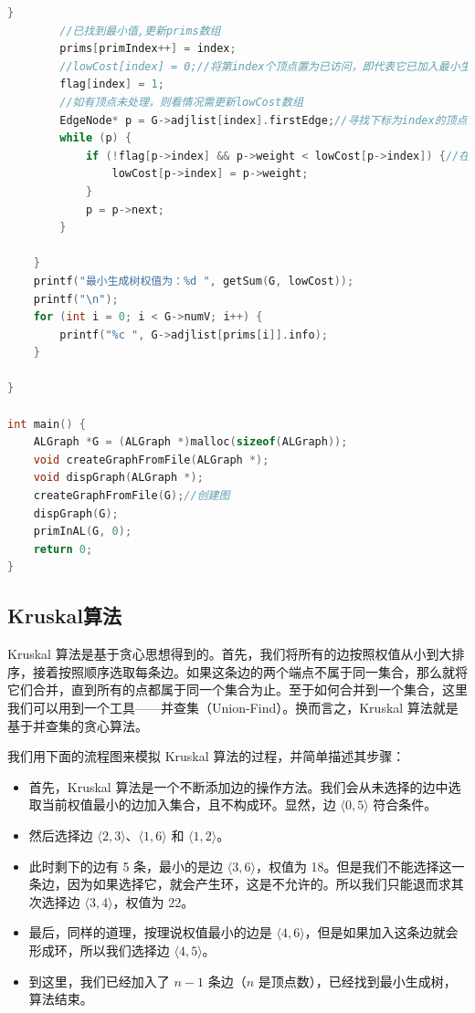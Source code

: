\documentclass[lang=cn,newtx,10pt,scheme=chinese]{../elegantbook}
\begin{document}
\begin{lstlisting}[language=C++, caption={Prim算法}]
		}
		//已找到最小值,更新prims数组
		prims[primIndex++] = index;
		//lowCost[index] = 0;//将第index个顶点置为已访问，即代表它已加入最小生成树
		flag[index] = 1;
		//如有顶点未处理，则看情况需更新lowCost数组
		EdgeNode* p = G->adjlist[index].firstEdge;//寻找下标为index的顶点可到达的顶点
		while (p) {
			if (!flag[p->index] && p->weight < lowCost[p->index]) {//在index处的旧值大于我们加入新节点后的
				lowCost[p->index] = p->weight;
			}
			p = p->next;
		}
		
	}
	printf("最小生成树权值为：%d ", getSum(G, lowCost));
	printf("\n");
	for (int i = 0; i < G->numV; i++) {
		printf("%c ", G->adjlist[prims[i]].info);
	}

}

int main() {
	ALGraph *G = (ALGraph *)malloc(sizeof(ALGraph));
	void createGraphFromFile(ALGraph *);
	void dispGraph(ALGraph *);
	createGraphFromFile(G);//创建图
	dispGraph(G);
	primInAL(G, 0);
	return 0;
}
\end{lstlisting}
\subsection{Kruskal算法}
Kruskal 算法是基于贪心思想得到的。首先，我们将所有的边按照权值从小到大排序，接着按照顺序选取每条边。如果这条边的两个端点不属于同一集合，那么就将它们合并，直到所有的点都属于同一个集合为止。至于如何合并到一个集合，这里我们可以用到一个工具——并查集（Union-Find）。换而言之，Kruskal 算法就是基于并查集的贪心算法。

我们用下面的流程图来模拟 Kruskal 算法的过程，并简单描述其步骤：

\begin{itemize}
  \item 首先，Kruskal 算法是一个不断添加边的操作方法。我们会从未选择的边中选取当前权值最小的边加入集合，且不构成环。显然，边 $\langle 0, 5 \rangle$ 符合条件。
  \item 然后选择边 $\langle 2, 3 \rangle$、$\langle 1, 6 \rangle$ 和 $\langle 1, 2 \rangle$。
  \item 此时剩下的边有 5 条，最小的是边 $\langle 3, 6 \rangle$，权值为 18。但是我们不能选择这一条边，因为如果选择它，就会产生环，这是不允许的。所以我们只能退而求其次选择边 $\langle 3, 4 \rangle$，权值为 22。
  \item 最后，同样的道理，按理说权值最小的边是 $\langle 4, 6 \rangle$，但是如果加入这条边就会形成环，所以我们选择边 $\langle 4, 5 \rangle$。
  \item 到这里，我们已经加入了 $n-1$ 条边（$n$ 是顶点数），已经找到最小生成树，算法结束。
\end{itemize}
\end{document}
